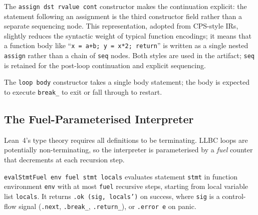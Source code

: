 The \texttt{assign dst rvalue cont} constructor makes the continuation explicit:
the statement following an assignment is the third constructor field rather than
a separate sequencing node. This representation, adopted from CPS-style IRs,
slightly reduces the syntactic weight of typical function encodings; it means
that a function body like ``\texttt{x = a+b; y = x*2; return}'' is written
as a single nested \texttt{assign} rather than a chain of \texttt{seq} nodes.
Both styles are used in the artifact; \texttt{seq} is retained for the
post-loop continuation and explicit sequencing.

The \texttt{loop body} constructor takes a single body statement; the body
is expected to execute \texttt{break\_} to exit or fall through to restart.

\subsection{The Fuel-Parameterised Interpreter}
\label{sec:interpreter}

Lean~4's type theory requires all definitions to be terminating. LLBC loops
are potentially non-terminating, so the interpreter is parameterised by a
\emph{fuel} counter that decrements at each recursion step.

\begin{definition}
\texttt{evalStmtFuel env fuel stmt locals} evaluates statement \texttt{stmt}
in function environment \texttt{env} with at most \texttt{fuel} recursive
steps, starting from local variable list \texttt{locals}. It returns
\texttt{.ok (sig, locals')} on success, where \texttt{sig} is a control-flow
signal (\texttt{.next}, \texttt{.break\_}, \texttt{.return\_}), or
\texttt{.error e} on panic.
\end{definition}

